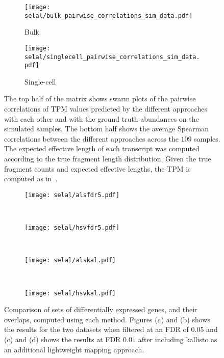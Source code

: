 \begin{figure}[h!]
    \centering
     \begin{subfigure}[t]{0.49\textwidth}
     \centering
  	  	\texttt{[image: selal/bulk\_pairwise\_correlations\_sim\_data.pdf]}
		\caption{Bulk}
    \end{subfigure}
     \begin{subfigure}[t]{0.49\textwidth}
     \centering
  	  	\texttt{[image: selal/singlecell\_pairwise\_correlations\_sim\_data.pdf]}
		\caption{Single-cell}
    \end{subfigure}
     \caption{The top half of the matrix shows swarm plots of the pairwise correlations of TPM 
	 values predicted by the
       different approaches with each other and with the ground truth abundances
       on the simulated samples. The bottom half shows the average Spearman
       correlations between the different approaches across the $109$ samples.
       The expected effective length of each transcript was computed according
       to the true fragment length distribution. Given the true fragment counts
       and expected effective lengths, the TPM is computed as in~\citet{rsem}.}
    \label{fig:swarmsimTPM}
\end{figure}

\begin{figure}[ht!]
    \centering
    \begin{subfigure}[t]{0.49\textwidth}
        \centering
  	  	\texttt{[image: selal/alsfdr5.pdf]}
		\caption{}
    \end{subfigure}
    ~ 
    \begin{subfigure}[t]{0.49\textwidth}
        \centering
  	  	\texttt{[image: selal/hsvfdr5.pdf]}
		\caption{}
    \end{subfigure}
    ~
    \begin{subfigure}[t]{0.49\textwidth}
        \centering
  	  	\texttt{[image: selal/alskal.pdf]}
		\caption{}
    \end{subfigure}
    ~ 
    \begin{subfigure}[t]{0.49\textwidth}
        \centering
  	  	\texttt{[image: selal/hsvkal.pdf]}
		\caption{}
    \end{subfigure}
    \caption{Comparison of sets of differentially expressed genes, and their overlaps, computed using each method.
    Figures (a) and (b) shows the results for the two datasets when filtered at an FDR of $0.05$ and 
    (c) and (d) shows the results at FDR $0.01$ after including kallisto as an additional lightweight mapping approach.}
    \label{fig:suppdge}
\end{figure}

